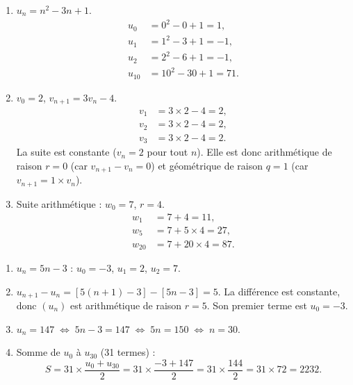 \documentclass[11pt]{article}
\newcommand{\cle}[1]{{\popxbold\color{popdark}#1}}
\begin{document}
\begin{corrige}
\begin{enumerate}
\item $u_n = n^2 - 3n + 1$.
  \begin{align*}
    u_0 &= 0^2 - 0 + 1 = 1,\\
    u_1 &= 1^2 - 3 + 1 = -1,\\
    u_2 &= 2^2 - 6 + 1 = -1,\\
    u_{10} &= 10^2 - 30 + 1 = 71.
  \end{align*}
\item $v_0 = 2$, $v_{n+1} = 3v_n - 4$.
  \begin{align*}
    v_1 &= 3\times2 - 4 = 2,\\
    v_2 &= 3\times2 - 4 = 2,\\
    v_3 &= 3\times2 - 4 = 2.
  \end{align*}
  La suite est constante ($v_n=2$ pour tout $n$). Elle est donc \cle{arithmétique} de raison $r=0$ (car $v_{n+1}-v_n=0$) et \cle{géométrique} de raison $q=1$ (car $v_{n+1}=1\times v_n$).
\item Suite arithmétique : $w_0 = 7$, $r = 4$.
  \begin{align*}
    w_1 &= 7 + 4 = 11,\\
    w_5 &= 7 + 5\times4 = 27,\\
    w_{20} &= 7 + 20\times4 = 87.
  \end{align*}
\end{enumerate}
\end{corrige}

\begin{corrige}
\begin{enumerate}
\item $u_n = 5n-3$ :
  $u_0 = -3$, $u_1 = 2$, $u_2 = 7$.
\item $u_{n+1}-u_n = [5(n+1)-3] - [5n-3] = 5$. La différence est constante, donc $(u_n)$ est \cle{arithmétique} de raison $r=5$. Son premier terme est $u_0 = -3$.
\item $u_n = 147 \;\Leftrightarrow\; 5n-3 = 147 \;\Leftrightarrow\; 5n = 150 \;\Leftrightarrow\; n = 30$.
\item Somme de $u_0$ à $u_{30}$ (31 termes) :
  \[
  S = 31 \times \frac{u_0+u_{30}}{2} = 31 \times \frac{-3+147}{2} = 31 \times \frac{144}{2} = 31 \times 72 = 2232.
  \]
\end{enumerate}
\end{corrige}
\end{document}
